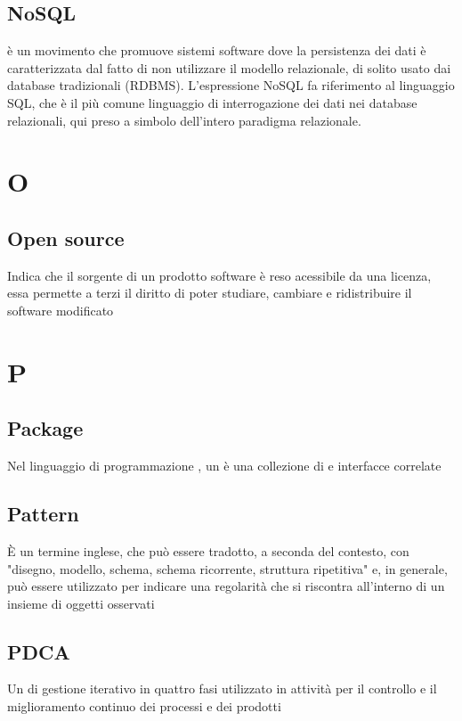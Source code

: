 {{	\subsection{NoSQL}
	è un movimento che promuove sistemi software dove la persistenza dei dati è caratterizzata dal fatto di non utilizzare il modello relazionale, di solito usato dai database tradizionali (RDBMS). L'espressione NoSQL fa riferimento al linguaggio SQL, che è il più comune linguaggio di interrogazione dei dati nei database relazionali, qui preso a simbolo dell'intero paradigma relazionale.


\section{O}
		\subsection{Open source}
		Indica che il  sorgente di un prodotto software è reso acessibile da una licenza, essa permette a terzi il diritto di poter studiare, cambiare e ridistribuire il software modificato


\section{P}
		\subsection{Package}
		Nel linguaggio di programmazione , un  è una collezione di  e interfacce correlate


		\subsection{Pattern}
		È un termine inglese, che può essere tradotto, a seconda del contesto, con "disegno, modello, schema, schema ricorrente, struttura ripetitiva" e, in generale, può essere utilizzato per indicare una regolarità che si riscontra all'interno di un insieme di oggetti osservati


		\subsection{PDCA}
		Un  di gestione iterativo in quattro fasi utilizzato in attività per il controllo e il miglioramento continuo dei processi e dei prodotti


}}
